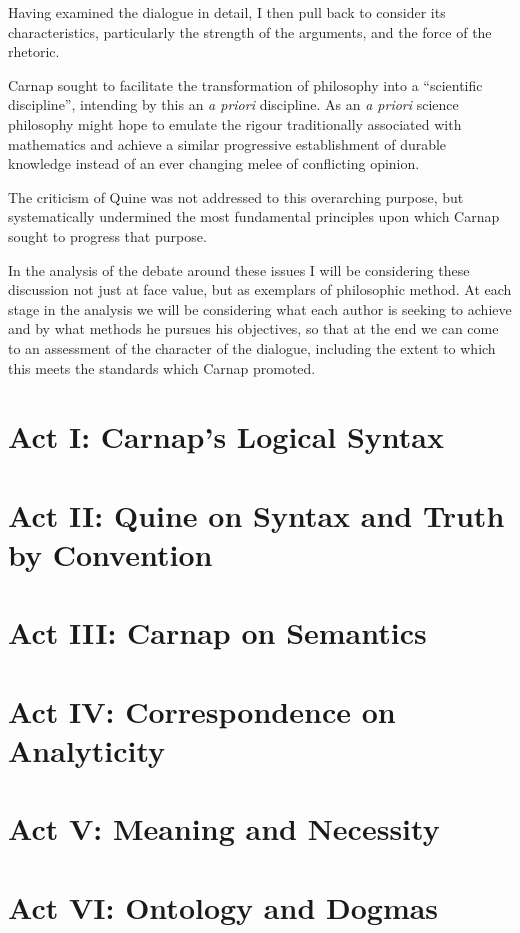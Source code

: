 Having examined the dialogue in detail, I then pull back to consider its characteristics,
particularly the strength of the arguments, and the force of the rhetoric.

Carnap sought to facilitate the transformation of philosophy into a ``scientific discipline'', intending by this an \emph{a priori} discipline.
As an \emph{a priori} science philosophy might hope to emulate the rigour traditionally associated with mathematics and achieve a similar progressive establishment of durable knowledge instead of an ever changing melee of conflicting opinion.

The criticism of Quine was not addressed to this overarching purpose, but systematically undermined the most fundamental principles upon which Carnap sought to progress that purpose.

In the analysis of the debate around these issues I will be considering these discussion not just at face value, but as exemplars of philosophic method.
At each stage in the analysis we will be considering what each author is seeking to achieve and by what methods he pursues his objectives, so that at the end we can come to an assessment of the character of the dialogue, including the extent to which this meets the standards which Carnap promoted.


\section{Act I: Carnap's Logical Syntax}

\section{Act II: Quine on Syntax and Truth by Convention}

\section{Act III: Carnap on Semantics}

\section{Act IV: Correspondence on Analyticity}

\section{Act V: Meaning and Necessity}

\section{Act VI: Ontology and Dogmas}

